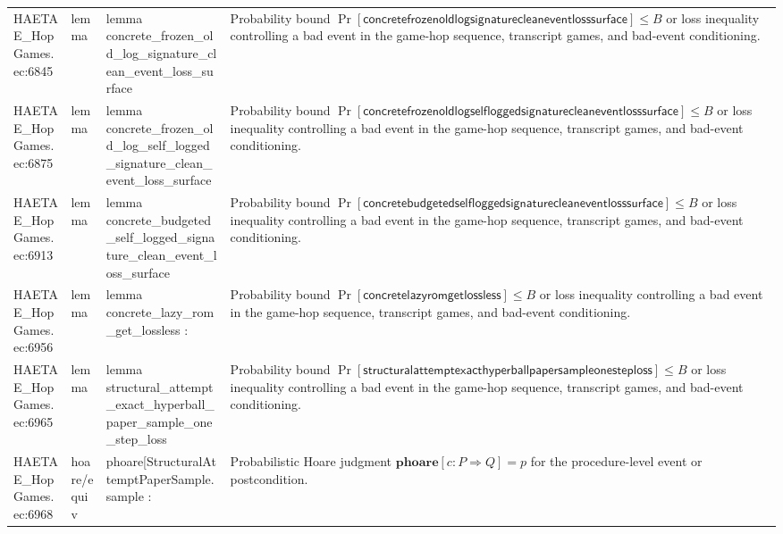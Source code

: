 \documentclass[10pt]{article}
\begin{document}
\begin{longtable}{L{0.11\textwidth}L{0.055\textwidth}L{0.385\textwidth}L{0.41\textwidth}}
HAETAE\_\allowbreak{}HopGames.\allowbreak{}ec:\allowbreak{}6845 & lemma & {\ttfamily\scriptsize lemma concrete\_\allowbreak{}frozen\_\allowbreak{}old\_\allowbreak{}log\_\allowbreak{}signature\_\allowbreak{}clean\_\allowbreak{}event\_\allowbreak{}loss\_\allowbreak{}surface} & Probability bound $\Pr[\mathsf{concretefrozenoldlogsignaturecleaneventlosssurface}]\le B$ or loss inequality controlling a bad event in the game-hop sequence, transcript games, and bad-event conditioning. \\
HAETAE\_\allowbreak{}HopGames.\allowbreak{}ec:\allowbreak{}6875 & lemma & {\ttfamily\scriptsize lemma concrete\_\allowbreak{}frozen\_\allowbreak{}old\_\allowbreak{}log\_\allowbreak{}self\_\allowbreak{}logged\_\allowbreak{}signature\_\allowbreak{}clean\_\allowbreak{}event\_\allowbreak{}loss\_\allowbreak{}surface} & Probability bound $\Pr[\mathsf{concretefrozenoldlogselfloggedsignaturecleaneventlosssurface}]\le B$ or loss inequality controlling a bad event in the game-hop sequence, transcript games, and bad-event conditioning. \\
HAETAE\_\allowbreak{}HopGames.\allowbreak{}ec:\allowbreak{}6913 & lemma & {\ttfamily\scriptsize lemma concrete\_\allowbreak{}budgeted\_\allowbreak{}self\_\allowbreak{}logged\_\allowbreak{}signature\_\allowbreak{}clean\_\allowbreak{}event\_\allowbreak{}loss\_\allowbreak{}surface} & Probability bound $\Pr[\mathsf{concretebudgetedselfloggedsignaturecleaneventlosssurface}]\le B$ or loss inequality controlling a bad event in the game-hop sequence, transcript games, and bad-event conditioning. \\
HAETAE\_\allowbreak{}HopGames.\allowbreak{}ec:\allowbreak{}6956 & lemma & {\ttfamily\scriptsize lemma concrete\_\allowbreak{}lazy\_\allowbreak{}rom\_\allowbreak{}get\_\allowbreak{}lossless :} & Probability bound $\Pr[\mathsf{concretelazyromgetlossless}]\le B$ or loss inequality controlling a bad event in the game-hop sequence, transcript games, and bad-event conditioning. \\
HAETAE\_\allowbreak{}HopGames.\allowbreak{}ec:\allowbreak{}6965 & lemma & {\ttfamily\scriptsize lemma structural\_\allowbreak{}attempt\_\allowbreak{}exact\_\allowbreak{}hyperball\_\allowbreak{}paper\_\allowbreak{}sample\_\allowbreak{}one\_\allowbreak{}step\_\allowbreak{}loss} & Probability bound $\Pr[\mathsf{structuralattemptexacthyperballpapersampleonesteploss}]\le B$ or loss inequality controlling a bad event in the game-hop sequence, transcript games, and bad-event conditioning. \\
HAETAE\_\allowbreak{}HopGames.\allowbreak{}ec:\allowbreak{}6968 & hoare/equiv & {\ttfamily\scriptsize phoare[StructuralAttemptPaperSample.sample :} & Probabilistic Hoare judgment $\mathbf{phoare}[c:P\Rightarrow Q]=p$ for the procedure-level event or postcondition. \\

\end{longtable}
\end{document}
